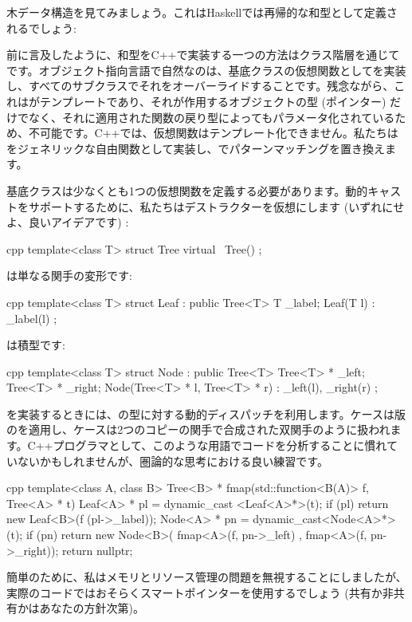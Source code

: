 木データ構造を見てみましょう。これはHaskellでは再帰的な和型として定義されるでしょう: 

前に言及したように、和型をC++で実装する一つの方法はクラス階層を通じてです。オブジェクト指向言語で自然なのは、基底クラスの仮想関数としてを実装し、すべてのサブクラスでそれをオーバーライドすることです。残念ながら、これはがテンプレートであり、それが作用するオブジェクトの型 (ポインター) だけでなく、それに適用された関数の戻り型によってもパラメータ化されているため、不可能です。C++では、仮想関数はテンプレート化できません。私たちはをジェネリックな自由関数として実装し、でパターンマッチングを置き換えます。

基底クラスは少なくとも1つの仮想関数を定義する必要があります。動的キャストをサポートするために、私たちはデストラクターを仮想にします (いずれにせよ、良いアイデアです) : 

\begin{snip}{cpp}
template<class T>
struct Tree {
    virtual ~Tree() {}
};
\end{snip}
は単なる関手の変形です: 

\begin{snip}{cpp}
template<class T>
struct Leaf : public Tree<T> {
    T _label;
    Leaf(T l) : _label(l) {}
};
\end{snip}
は積型です: 

\begin{snip}{cpp}
template<class T>
struct Node : public Tree<T> {
    Tree<T> * _left;
    Tree<T> * _right;
    Node(Tree<T> * l, Tree<T> * r) : _left(l), _right(r) {}
};
\end{snip}
を実装するときには、の型に対する動的ディスパッチを利用します。ケースは版のを適用し、ケースは2つのコピーの関手で合成された双関手のように扱われます。C++プログラマとして、このような用語でコードを分析することに慣れていないかもしれませんが、圏論的な思考における良い練習です。

\begin{snip}{cpp}
template<class A, class B>
Tree<B> * fmap(std::function<B(A)> f, Tree<A> * t) {
    Leaf<A> * pl = dynamic_cast <Leaf<A>*>(t);
    if (pl)
        return new Leaf<B>(f (pl->_label));
    Node<A> * pn = dynamic_cast<Node<A>*>(t);
    if (pn)
        return new Node<B>( fmap<A>(f, pn->_left)
                          , fmap<A>(f, pn->_right));
    return nullptr;
}
\end{snip}
簡単のために、私はメモリとリソース管理の問題を無視することにしましたが、実際のコードではおそらくスマートポインターを使用するでしょう (共有か非共有かはあなたの方針次第)。

